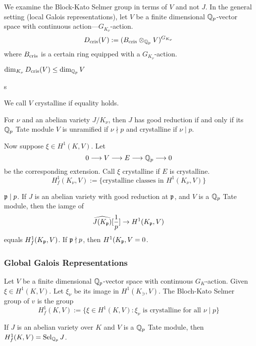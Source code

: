 We examine the Block-Kato Selmer group in terms of $V$ and not $J$. In the general setting (local Galois representations), let $V$ be a finite dimensional $\mathbb{Q}_p$-vector space with continuous action---$G_{K_\nu}$-action. 
	\[
	D_{\text{cris}}(V):= (B_{\text{cris}} \otimes_{\mathbb{Q}_p} V)^{G_{K_\nu}}
	\]
where $B_{\text{cris}}$ is a certain ring equipped with a $G_{K_\nu}$-action. 


\begin{rem}
$\dim_{K_\nu} D_{\text{cris}}(V) \leq \dim_{\mathbb{Q}_p} V$
\end{rem}s


\begin{dfn}[Crystalline]
We call $V$ crystalline if equality holds. 
\end{dfn}


\begin{rem}
For $\nu$ and an abelian variety $J/K_\nu$, then $J$ has good reduction if and only if its $\mathbb{Q}_p$ Tate module $V$ is unramified if $\nu \nmid p$ and crystalline if $\nu \mid p$. 
\end{rem}


Now suppose $\xi \in H^1(K,V)$. Let
	\[
	0 \stackrel{}{\longrightarrow} V \stackrel{}{\longrightarrow} E \stackrel{}{\longrightarrow} \mathbb{Q}_p \stackrel{}{\longrightarrow} 0
	\]
be the corresponding extension. Call $\xi$ crystalline if $E$ is crystalline. 
	\[
	H_f^1(K_\nu,V):= \{ \text{crystalline classes in } H^1(K_\nu,V) \}
	\]


\begin{rem}
$\mathfrak{p} \mid p$. If $J$ is an abelian variety with good reduction at $\mathfrak{p}$, and $V$ is a $\mathbb{Q}_p$ Tate module, then the iamge of
	\[
	\widehat{J(K_{\mathfrak{p}})}[\frac{1}{p}] \to H^1(K_{\mathfrak{p}},V)
	\]
equals $H_f^1(K_{\mathfrak{p}},V)$. If $\mathfrak{p} \nmid p$, then $H^1(K_{\mathfrak{p}},V= 0$.
\end{rem}



\subsubsection{Global Galois Representations}

Let $V$ be a finite dimensional $\mathbb{Q}_p$-vector space with continuous $G_K$-action. Given $\xi \in H^1(K,V)$. Let $\xi_\nu$ be its image in $H^1(K_\ni,V)$. The Bloch-Kato Selmer group of $v$ is the group
	\[
	H_f^1(K,V):= \{ \xi \in H^1(K,V) \colon \xi_\nu \text{ is crystalline for all } \nu \mid p \}
	\]


\begin{rem}
If $J$ is an abelian variety over $K$ and $V$ is a $\mathbb{Q}_p$ Tate module, then $H_f^1(K,V)= \operatorname{Sel}_{\mathbb{Q}_p} J$. 
\end{rem}


